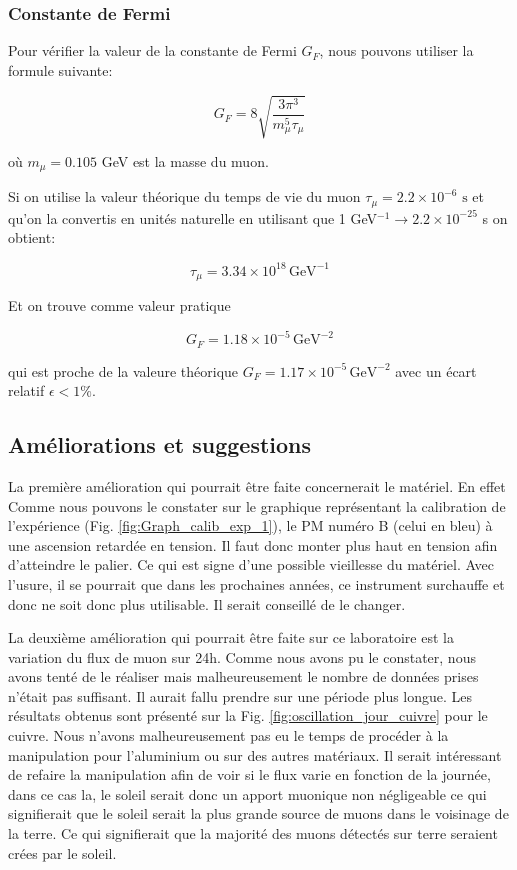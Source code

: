 \documentclass[12pt]{article}
\begin{document}
\subsubsection{Constante de Fermi}

Pour vérifier la valeur de la constante de Fermi $G_{F}$, nous pouvons utiliser la formule suivante:

\[ G_{F} =8\sqrt{\frac{3\pi^{3}}{m_{\mu}^{5}\tau_{\mu}}} \]

où $m_{\mu}=0.105$ GeV est la masse du muon.

Si on utilise la valeur théorique du temps de vie du muon $\tau_{\mu}=2.2\times10^{-6} \text{ s}$ et qu'on la convertis en unités naturelle en utilisant que 1 GeV$^{-1}\rightarrow2.2\times10^{-25}$ s on obtient:

\[ \tau_{\mu}=3.34\times10^{18}\,\text{GeV}^{-1}\]

Et on trouve comme valeur pratique

\[ G_{F}=1.18\times10^{-5}\,\text{GeV}^{-2}\]

qui est proche de la valeure théorique $G_{F}=1.17\times10^{-5}\,\text{GeV}^{-2}$ avec un écart relatif $\epsilon<1\%$.

\subsection{Améliorations et suggestions}

La première amélioration qui pourrait être faite concernerait le matériel. En effet Comme nous pouvons le constater sur le graphique représentant la calibration de l'expérience (Fig. \ref{fig:Graph_calib_exp_1}), le PM numéro B (celui en bleu) à une ascension retardée en tension. Il faut donc monter plus haut en tension afin d'atteindre le palier. Ce qui est signe d'une possible vieillesse du matériel. Avec l'usure, il se pourrait que dans les prochaines années, ce instrument surchauffe et donc ne soit donc plus utilisable. Il serait conseillé de le changer. 

La deuxième amélioration qui pourrait être faite sur ce laboratoire est la variation du flux de muon sur 24h. Comme nous avons pu le constater, nous avons tenté de le réaliser mais malheureusement le nombre de données prises n'était pas suffisant. Il aurait fallu prendre sur une période plus longue. Les résultats obtenus sont présenté sur la Fig. \ref{fig:oscillation_jour_cuivre} pour le cuivre. Nous n'avons malheureusement pas eu le temps de procéder à la manipulation pour l'aluminium ou sur des autres matériaux. Il serait intéressant de refaire la manipulation afin de voir si le flux varie en fonction de la journée, dans ce cas la, le soleil serait donc un apport muonique non négligeable ce qui signifierait que le soleil serait la plus grande source de muons dans le voisinage de la terre. Ce qui signifierait que la majorité des muons détectés sur terre seraient crées par le soleil.
\end{document}
